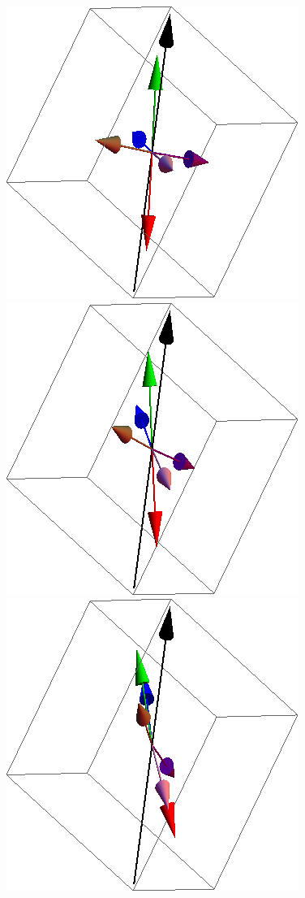 \documentclass{article}
\begin{document}
\begin{figure}[ht]
\includegraphics[scale=0.27]{111_2000/4S005to000R.png}
\includegraphics[scale=0.27]{111_2000/5S005to000R.png}
\includegraphics[scale=0.27]{111_2000/6S005to000R.png}

\end{figure}
\end{document}
